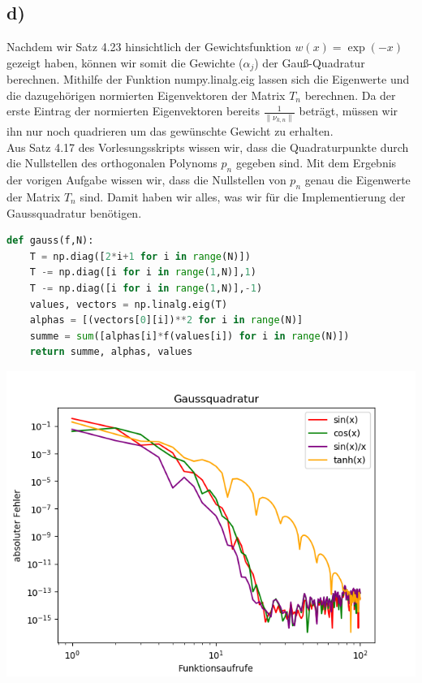 \subsection*{d)}
Nachdem wir Satz 4.23 hinsichtlich der Gewichtsfunktion $w(x)=\exp(-x)$ gezeigt haben, können wir somit die Gewichte ($\alpha_{j}$) der Gauß-Quadratur berechnen.
Mithilfe der Funktion numpy.linalg.eig lassen sich die Eigenwerte und die dazugehörigen normierten Eigenvektoren der Matrix $T_{n}$ berechnen. Da der erste Eintrag der normierten Eigenvektoren bereits $\frac{1}{\lVert\nu_{k,n}\rVert}$ beträgt, müssen wir ihn nur noch quadrieren um das gewünschte Gewicht zu erhalten.\\
Aus Satz 4.17 des Vorlesungsskripts wissen wir, dass die Quadraturpunkte durch die Nullstellen des orthogonalen Polynoms $p_n$ gegeben sind. Mit dem Ergebnis der vorigen Aufgabe wissen wir, dass die Nullstellen von $p_n$ genau die Eigenwerte der Matrix $T_n$ sind. Damit haben wir alles, was wir für die Implementierung der Gaussquadratur benötigen.\\
\begin{lstlisting}[language=Python]
def gauss(f,N):
    T = np.diag([2*i+1 for i in range(N)])
    T -= np.diag([i for i in range(1,N)],1)
    T -= np.diag([i for i in range(1,N)],-1)
    values, vectors = np.linalg.eig(T)
    alphas = [(vectors[0][i])**2 for i in range(N)]
    summe = sum([alphas[i]*f(values[i]) for i in range(N)])
    return summe, alphas, values
\end{lstlisting}
\includegraphics[width=\linewidth]{Aufgabe_1/gauss.png}
